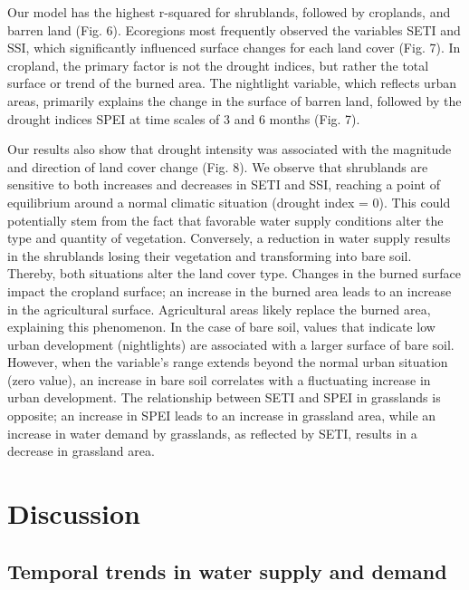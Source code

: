 \documentclass[
  sn-nature,
  numbered]{sn-jnl}
\begin{document}
Our model has the highest r-squared for shrublands, followed by
croplands, and barren land (Fig. 6). Ecoregions most frequently observed
the variables SETI and SSI, which significantly influenced surface
changes for each land cover (Fig. 7). In cropland, the primary factor is
not the drought indices, but rather the total surface or trend of the
burned area. The nightlight variable, which reflects urban areas,
primarily explains the change in the surface of barren land, followed by
the drought indices SPEI at time scales of 3 and 6 months (Fig. 7).

Our results also show that drought intensity was associated with the
magnitude and direction of land cover change (Fig. 8). We observe that
shrublands are sensitive to both increases and decreases in SETI and
SSI, reaching a point of equilibrium around a normal climatic situation
(drought index = 0). This could potentially stem from the fact that
favorable water supply conditions alter the type and quantity of
vegetation. Conversely, a reduction in water supply results in the
shrublands losing their vegetation and transforming into bare soil.
Thereby, both situations alter the land cover type. Changes in the
burned surface impact the cropland surface; an increase in the burned
area leads to an increase in the agricultural surface. Agricultural
areas likely replace the burned area, explaining this phenomenon. In the
case of bare soil, values that indicate low urban development
(nightlights) are associated with a larger surface of bare soil.
However, when the variable's range extends beyond the normal urban
situation (zero value), an increase in bare soil correlates with a
fluctuating increase in urban development. The relationship between SETI
and SPEI in grasslands is opposite; an increase in SPEI leads to an
increase in grassland area, while an increase in water demand by
grasslands, as reflected by SETI, results in a decrease in grassland
area.

\section{Discussion}\label{discussion}

\subsection{Temporal trends in water supply and
demand}\label{temporal-trends-in-water-supply-and-demand}
\end{document}
